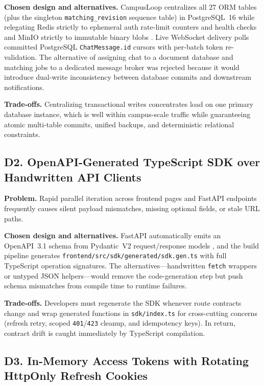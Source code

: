 \textbf{Chosen design and alternatives.} CampusLoop centralizes all 27 ORM tables (plus the singleton \texttt{matching\_revision} sequence table) in PostgreSQL~16 \cite{postgresExplicitLocking} while relegating Redis strictly to ephemeral auth rate-limit counters and health checks \cite{redisDocs} and MinIO strictly to immutable binary blobs \cite{minioDocs}. Live WebSocket delivery polls committed PostgreSQL \texttt{ChatMessage.id} cursors with per-batch token re-validation. The alternative of assigning chat to a document database and matching jobs to a dedicated message broker was rejected because it would introduce dual-write inconsistency between database commits and downstream notifications.

\textbf{Trade-offs.} Centralizing transactional writes concentrates load on one primary database instance, which is well within campus-scale traffic while guaranteeing atomic multi-table commits, unified backups, and deterministic relational constraints.

\subsection{D2. OpenAPI-Generated TypeScript SDK over Handwritten API Clients}

\textbf{Problem.} Rapid parallel iteration across frontend pages and FastAPI endpoints frequently causes silent payload mismatches, missing optional fields, or stale URL paths.

\textbf{Chosen design and alternatives.} FastAPI automatically emits an OpenAPI~3.1 schema \cite{fastapiDocs,openapi31} from Pydantic~V2 request/response models \cite{pydanticDocs}, and the build pipeline generates \texttt{frontend/src/sdk/generated/sdk.gen.ts} with full TypeScript operation signatures. The alternatives---handwritten \texttt{fetch} wrappers or untyped JSON helpers---would remove the code-generation step but push schema mismatches from compile time to runtime failures.

\textbf{Trade-offs.} Developers must regenerate the SDK whenever route contracts change and wrap generated functions in \texttt{sdk/index.ts} for cross-cutting concerns (refresh retry, scoped \texttt{401}/\texttt{423} cleanup, and idempotency keys). In return, contract drift is caught immediately by TypeScript compilation.

\subsection{D3. In-Memory Access Tokens with Rotating HttpOnly Refresh Cookies}

